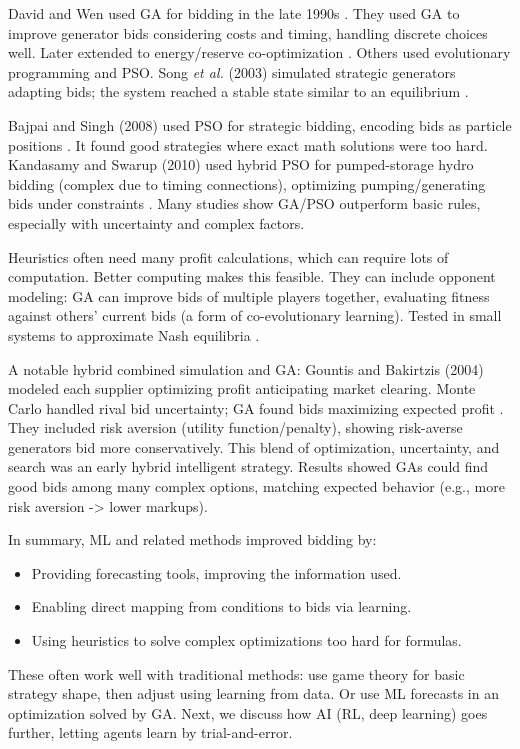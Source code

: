 \documentclass[conference]{IEEEtran}
\begin{document}
David and Wen used GA for bidding in the late 1990s \cite{David1999GA}. They used GA to improve generator bids considering costs and timing, handling discrete choices well. Later extended to energy/reserve co-optimization \cite{David2001GA}. Others used evolutionary programming and PSO. Song \textit{et al.} (2003) simulated strategic generators adapting bids; the system reached a stable state similar to an equilibrium \cite{Song2003EP}.

Bajpai and Singh (2008) used PSO for strategic bidding, encoding bids as particle positions \cite{Bajpai2008}. It found good strategies where exact math solutions were too hard. Kandasamy and Swarup (2010) used hybrid PSO for pumped-storage hydro bidding (complex due to timing connections), optimizing pumping/generating bids under constraints \cite{Kandasamy2010}. Many studies show GA/PSO outperform basic rules, especially with uncertainty and complex factors.

Heuristics often need many profit calculations, which can require lots of computation. Better computing makes this feasible. They can include opponent modeling: GA can improve bids of multiple players together, evaluating fitness against others' current bids (a form of co-evolutionary learning). Tested in small systems to approximate Nash equilibria \cite{Ventosa2005}.

A notable hybrid combined simulation and GA: Gountis and Bakirtzis (2004) modeled each supplier optimizing profit anticipating market clearing. Monte Carlo handled rival bid uncertainty; GA found bids maximizing expected profit \cite{Gountis2004}. They included risk aversion (utility function/penalty), showing risk-averse generators bid more conservatively. This blend of optimization, uncertainty, and search was an early hybrid intelligent strategy. Results showed GAs could find good bids among many complex options, matching expected behavior (e.g., more risk aversion -> lower markups).

In summary, ML and related methods improved bidding by:
\begin{itemize}
    \item Providing forecasting tools, improving the information used.
    \item Enabling direct mapping from conditions to bids via learning.
    \item Using heuristics to solve complex optimizations too hard for formulas.
\end{itemize}
These often work well with traditional methods: use game theory for basic strategy shape, then adjust using learning from data. Or use ML forecasts in an optimization solved by GA. Next, we discuss how AI (RL, deep learning) goes further, letting agents learn by trial-and-error.
\end{document}
